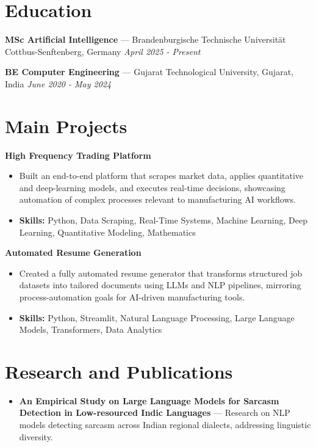 \documentclass[a4paper,10pt]{article}
\begin{document}
\section*{Education}
\textbf{MSc Artificial Intelligence} — Brandenburgische Technische Universität Cottbus-Senftenberg, Germany \hfill \textit{April 2025 - Present}\par
\vspace{1.5pt}
\textbf{BE Computer Engineering} — Gujarat Technological University, Gujarat, India \hfill \textit{June 2020 - May 2024}\par

\section*{Main Projects}
\textbf{High Frequency Trading Platform}\par
\vspace{1pt}
\begin{itemize}
  \item Built an end-to-end platform that scrapes market data, applies quantitative and deep-learning models, and executes real-time decisions, showcasing automation of complex processes relevant to manufacturing AI workflows.
  \item \textbf{Skills:} Python, Data Scraping, Real-Time Systems, Machine Learning, Deep Learning, Quantitative Modeling, Mathematics
\end{itemize}
\vspace{3pt}
\textbf{Automated Resume Generation}\par
\vspace{1pt}
\begin{itemize}
  \item Created a fully automated resume generator that transforms structured job datasets into tailored documents using LLMs and NLP pipelines, mirroring process-automation goals for AI-driven manufacturing tools.
  \item \textbf{Skills:} Python, Streamlit, Natural Language Processing, Large Language Models, Transformers, Data Analytics
\end{itemize}

\section*{Research and Publications}
\begin{itemize}
\item \textbf{An Empirical Study on Large Language Models for Sarcasm Detection in Low-resourced Indic Languages} — Research on NLP models detecting sarcasm across Indian regional dialects, addressing linguistic diversity.
\end{itemize}
\end{document}
